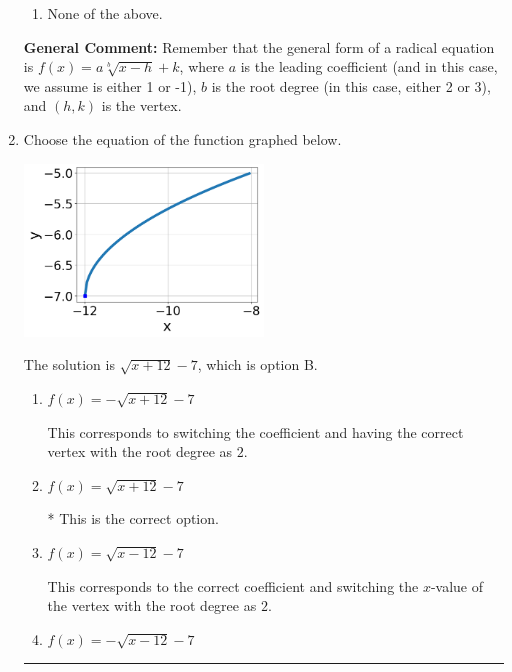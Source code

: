 \documentclass{extbook}[14pt]
\newcommand{\litem}[1]{\item #1

\rule{\textwidth}{0.4pt}}
\begin{document}
\begin{enumerate}
{\begin{enumerate}[label=\Alph*.]
\item None of the above.\end{enumerate}
\textbf{General Comment:} Remember that the general form of a radical equation is $ f(x) = a \sqrt[b]{x - h} + k $, where $a$ is the leading coefficient (and in this case, we assume is either 1 or -1), $b$ is the root degree (in this case, either 2 or 3), and $(h, k)$ is the vertex.
}
\litem{
Choose the equation of the function graphed below.

\begin{center}
    \includegraphics[width=0.5\textwidth]{../Figures/radicalGraphToEquationCopyA.png}
\end{center}



The solution is \( \sqrt{x + 12} - 7 \), which is option B.\begin{enumerate}[label=\Alph*.]
\item \( f(x) = - \sqrt{x + 12} - 7 \)

This corresponds to switching the coefficient and having the correct vertex with the root degree as $2$.
\item \( f(x) = \sqrt{x + 12} - 7 \)

* This is the correct option.
\item \( f(x) = \sqrt{x - 12} - 7 \)

This corresponds to the correct coefficient and switching the $x$-value of the vertex with the root degree as $2$.
\item \( f(x) = - \sqrt{x - 12} - 7 \)


\end{enumerate}}
\end{enumerate}
\end{document}
